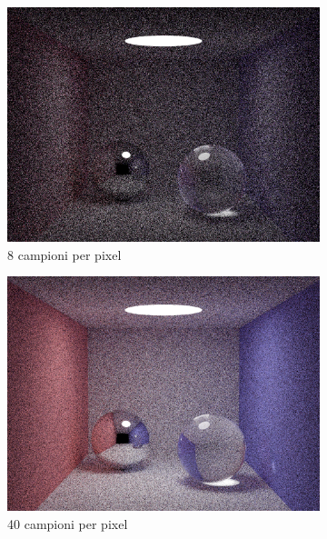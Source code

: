 \begin{figure}[tb]
    \begin{subfigure}[c]{0.4\linewidth}
	\centering
	\includegraphics[width=\linewidth]{../assets/appendixD_result_8.png}
	\caption{8 campioni per pixel}
    \end{subfigure}\hspace{12pt}
    \begin{subfigure}[c]{0.4\linewidth}
	\centering
	\includegraphics[width=\linewidth]{../assets/appendixD_result_40.png}
	\caption{40 campioni per pixel}
    \end{subfigure}\hfill
    \begin{subfigure}[c]{0.4\linewidth}

\end{subfigure}
\end{figure}
